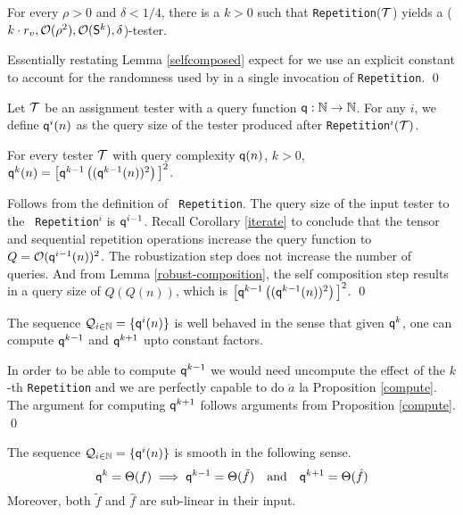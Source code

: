 \begin{corollary}\label{repeat} For every $\rho > 0$ and $\delta < 1/4$, there is a  $k > 0$ such that
  {\tt Repetition}(${\cal T}$) yields a ($k \cdot r_v, {\cal O}(\rho^2), {\cal O}({\sf S}^k), \delta$)-tester.
\end{corollary}
  Essentially restating Lemma \ref{selfcomposed}
expect for we use an explicit constant to account for the randomness
used by in a single invocation of {\tt Repetition}. \qed

\begin{definition}\label{queries}
  Let ${\cal T}$ be an assignment tester with a query function ${\sf q} :
  \mathbb{N} \rightarrow \mathbb{N}$.  For any $i$, we define ${\sf q}^{i}(n)$
    as the query size of the tester produced after {\tt Repetition}$^i({\cal T})$.
\end{definition}

\begin{proposition}\label{compute}
  For every tester ${\cal T}$ with query complexity ${\sf q}(n)$, $k > 0$,
  ${\sf q}^{k}(n) = \big[{\sf q}^{k-1}\left(({\sf q}^{k-1}(n))^2\right)\big]^2$.
\end{proposition}
  Follows from the definition of {\tt
  Repetition}. The query size of the input tester to the {\tt
  Repetition}$^i$ is ${\sf q}^{i-1}$. Recall Corollary \ref{iterate} to conclude
that the tensor and sequential repetition operations increase the
query function to $Q = {\cal O}({\sf q}^{i-1}(n))^2$. The robustization
step does not increase the number of queries. And from Lemma
\ref{robust-composition}, the self composition step results in a query
size of $Q(Q(n))$, which is
$\big[{\sf q}^{k-1}\left(({\sf q}^{k-1}(n))^2\right)\big]^2$. \qed
 
\begin{lemma}
  The sequence ${\cal Q}_{i \in \mathbb{N}} = \{{\sf q}^{i}(n)\}$ is well
  behaved in the sense that given ${\sf q}^k$, one can compute ${\sf q}^{k-1}$
  and ${\sf q}^{k+1}$ upto constant factors.
\end{lemma}
 In order to be able to compute ${\sf q}^{k-1}$ we
would need uncompute the effect of the $k$-th {\tt Repetition} and we
are perfectly capable to do $\grave{a}$ la Proposition \ref{compute}. The
argument for computing ${\sf q}^{k+1}$ follows arguments from Proposition
\ref{compute}. \qed


\begin{corollary}\label{smooth}
  The sequence ${\cal Q}_{i \in \mathbb{N}} = \{{\sf q}^{i}(n)\}$ is smooth
  in the following sense. 
\[
        {\sf q}^{k} = \Theta(f) \implies {\sf q}^{k-1} = \Theta(\tilde{f}) \quad \mbox{and} \quad {\sf q}^{k+1} = \Theta(\hat{f})
\]
Moreover, both $\tilde{f}$ and $\hat{f}$ are sub-linear in their input.
\end{corollary}



